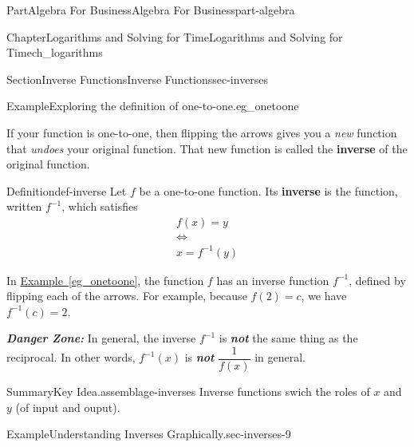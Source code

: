 \documentclass{tufte-book}
\newcommand{\xreffont}{\relax}
\newcommand{\alert}[1]{\textbf{\textit{#1}}}
\newcommand{\terminology}[1]{\textbf{#1}}
\numberwithin{equation}{chapter}
\begin{document}
\begin{partptx}{Part}{Algebra For Business}{}{Algebra For Business}{}{}{part-algebra}
\begin{chapterptx}{Chapter}{Logarithms and Solving for Time}{}{Logarithms and Solving for Time}{}{}{ch_logarithms}
\begin{sectionptx}{Section}{Inverse Functions}{}{Inverse Functions}{}{}{sec-inverses}
\begin{example}{Example}{Exploring the definition of one-to-one.}{eg_onetoone}
\begin{image}{0}{1}{0}{}
{
\qquad
{}
}%
\end{image}%
\end{example}
If your function is one-to-one, then flipping the arrows gives you a \emph{new} function that \emph{undoes} your original function. That new function is called the \terminology{inverse} of the original function.%
\begin{definition}{Definition}{}{def-inverse}%
Let \(f\) be a one-to-one function. Its \terminology{inverse} is the function, written \(f^{-1}\), which satisfies%
\begin{gather*}
f(x)   =    y \\
\iff      \\
x     =    f^{-1}(y) 
\end{gather*}
%
\end{definition}
In \hyperref[eg_onetoone]{Example~{\xreffont\ref{eg_onetoone}}}, the function \(f\) has an inverse function \(f^{-1}\), defined by flipping each of the arrows. For example, because \(f(2) = c\), we have \(f^{-1}(c) = 2\).%
\par
\alert{Danger Zone:} In general, the inverse \(f^{-1}\) is \alert{not} the same thing as the reciprocal.  In other words, \(f^{-1}(x)\) is \alert{not} \(\dfrac{1}{f(x)}\) in general.%
\begin{assemblage}{Summary}{Key Idea.}{assemblage-inverses}%
Inverse functions swich the roles of \(x\) and \(y\) (of input and ouput).%
\end{assemblage}
\begin{example}{Example}{Understanding Inverses Graphically.}{sec-inverses-9}%

\end{example}
\end{sectionptx}
\end{chapterptx}
\end{partptx}
\end{document}
